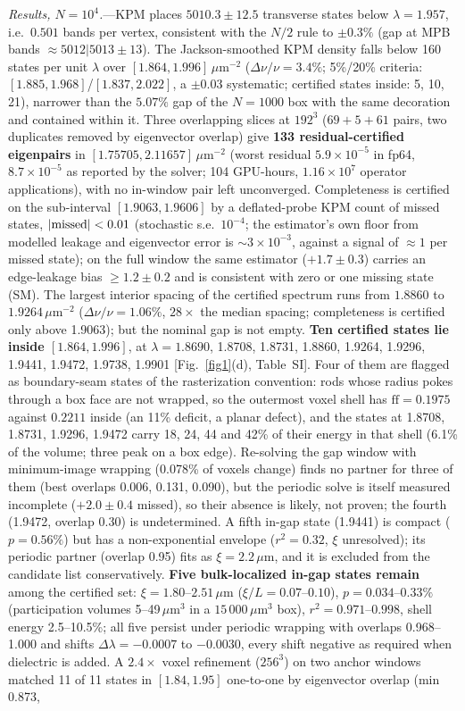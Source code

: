 \documentclass[prl,twocolumn,superscriptaddress,showpacs]{revtex4-2}
\newcommand{\um}{\,\mu\mathrm{m}}
\newcommand{\umi}{\,\mu\mathrm{m}^{-2}}
\begin{document}
\emph{Results, $N=10^4$.}---KPM places $5010.3\pm12.5$ transverse states below $\lambda=1.957$, i.e.\ $0.501$ bands per vertex, consistent with the $N/2$ rule to $\pm0.3\%$ (gap at MPB bands $\approx5012|5013\pm13$). The Jackson-smoothed KPM density falls below 160 states per unit $\lambda$ over $[1.864,1.996]\umi$ ($\Delta\nu/\nu=3.4\%$; 5\%/20\% criteria: $[1.885,1.968]$/$[1.837,2.022]$, a $\pm0.03$ systematic; certified states inside: 5, 10, 21), narrower than the $5.07\%$ gap of the $N=1000$ box with the same decoration and contained within it. Three overlapping slices at $192^3$ ($69+5+61$ pairs, two duplicates removed by eigenvector overlap) give \textbf{133 residual-certified eigenpairs} in $[1.75705,2.11657]\umi$ (worst residual $5.9\times10^{-5}$ in fp64, $8.7\times10^{-5}$ as reported by the solver; 104 GPU-hours, $1.16\times10^{7}$ operator applications), with no in-window pair left unconverged. Completeness is certified on the sub-interval $[1.9063,1.9606]$ by a deflated-probe KPM count of missed states, $|{\rm missed}|<0.01$ (stochastic s.e.\ $10^{-4}$; the estimator's own floor from modelled leakage and eigenvector error is $\sim3\times10^{-3}$, against a signal of $\approx1$ per missed state); on the full window the same estimator ($+1.7\pm0.3$) carries an edge-leakage bias $\ge1.2\pm0.2$ and is consistent with zero or one missing state (SM). The largest interior spacing of the certified spectrum runs from $1.8860$ to $1.9264\umi$ ($\Delta\nu/\nu=1.06\%$, $28\times$ the median spacing; completeness is certified only above 1.9063); but the nominal gap is not empty. \textbf{Ten certified states lie inside $[1.864,1.996]$}, at $\lambda=1.8690$, 1.8708, 1.8731, 1.8860, 1.9264, 1.9296, 1.9441, 1.9472, 1.9738, 1.9901 [Fig.~\ref{fig1}(d), Table~SI]. Four of them are flagged as boundary-seam states of the rasterization convention: rods whose radius pokes through a box face are not wrapped, so the outermost voxel shell has $\mathrm{ff}=0.1975$ against $0.2211$ inside (an 11\% deficit, a planar defect), and the states at 1.8708, 1.8731, 1.9296, 1.9472 carry 18, 24, 44 and 42\% of their energy in that shell (6.1\% of the volume; three peak on a box edge). Re-solving the gap window with minimum-image wrapping (0.078\% of voxels change) finds no partner for three of them (best overlaps 0.006, 0.131, 0.090), but the periodic solve is itself measured incomplete ($+2.0\pm0.4$ missed), so their absence is likely, not proven; the fourth (1.9472, overlap 0.30) is undetermined. A fifth in-gap state (1.9441) is compact ($p=0.56\%$) but has a non-exponential envelope ($r^2=0.32$, $\xi$ unresolved); its periodic partner (overlap 0.95) fits as $\xi=2.2\um$, and it is excluded from the candidate list conservatively. \textbf{Five bulk-localized in-gap states remain} among the certified set: $\xi=1.80$--$2.51\um$ ($\xi/L=0.07$--$0.10$), $p=0.034$--$0.33\%$ (participation volumes 5--49$\um^3$ in a $15\,000\um^3$ box), $r^2=0.971$--$0.998$, shell energy 2.5--10.5\%; all five persist under periodic wrapping with overlaps 0.968--1.000 and shifts $\Delta\lambda=-0.0007$ to $-0.0030$, every shift negative as required when dielectric is added. A $2.4\times$ voxel refinement ($256^3$) on two anchor windows matched 11 of 11 states in $[1.84,1.95]$ one-to-one by eigenvector overlap (min 0.873, 
\end{document}
